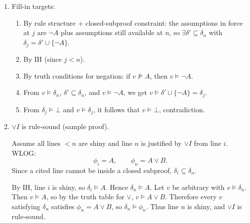 \documentclass[12pt]{article}
\newcommand{\forces}{\models}
\begin{document}
\begin{enumerate}
    \item Fill-in targets:
    \begin{enumerate}[label=\arabic*.]
        \item By rule structure + closed-subproof constraint: the assumptions in force at \(j\) are \(\neg A\) plus assumptions still available at \(n\), so \(\exists\delta'\subseteq\delta_n\) with \(\delta_j=\delta'\cup\{\neg A\}\).
        \item By IH (since \(j<n\)).
        \item By truth conditions for negation: if \(v\not\forces A\), then \(v\forces\neg A\).
        \item From \(v\forces\delta_n\), \(\delta'\subseteq\delta_n\), and \(v\forces\neg A\), we get \(v\forces\delta'\cup\{\neg A\}=\delta_j\).
        \item From \(\delta_j\forces\bot\) and \(v\forces\delta_j\), it follows that \(v\forces\bot\), contradiction.
    \end{enumerate}

    \item \( \vee I \) is rule-sound (sample proof).

    Assume all lines \(<n\) are shiny and line \(n\) is justified by \(\vee I\) from line \(i\). WLOG:
    \[
    \phi_i=A,\qquad \phi_n=A\vee B.
    \]
    Since a cited line cannot be inside a closed subproof, \(\delta_i\subseteq\delta_n\).

    By IH, line \(i\) is shiny, so \(\delta_i\forces A\). Hence \(\delta_n\forces A\).
    Let \(v\) be arbitrary with \(v\forces\delta_n\). Then \(v\forces A\), so by the truth table for \(\vee\), \(v\forces A\vee B\).
    Therefore every \(v\) satisfying \(\delta_n\) satisfies \(\phi_n=A\vee B\), so \(\delta_n\forces\phi_n\). Thus line \(n\) is shiny, and \(\vee I\) is rule-sound.

\end{enumerate}
\end{document}
